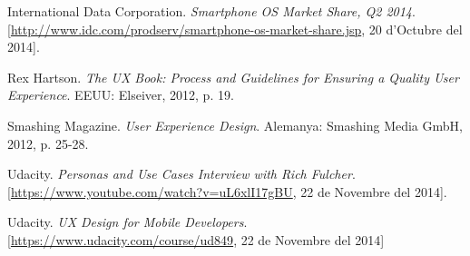 \begin{thebibliography}{9}

International Data Corporation. \textit{Smartphone OS Market Share, Q2 2014}. [\url{http://www.idc.com/prodserv/smartphone-os-market-share.jsp}, 20 d'Octubre del 2014].

Rex Hartson. \textit{The UX Book: Process and Guidelines for Ensuring a Quality User Experience}. EEUU: Elseiver, 2012, p. 19.

Smashing Magazine. \textit{User Experience Design}. Alemanya: Smashing Media GmbH, 2012, p. 25-28.

Udacity. \textit{Personas and Use Cases Interview with Rich Fulcher}. [\url{https://www.youtube.com/watch?v=uL6xlI17gBU}, 22 de Novembre del 2014]. 

Udacity. \textit{UX Design for Mobile Developers}. [\url{https://www.udacity.com/course/ud849}, 22 de Novembre del 2014]

\end{thebibliography}